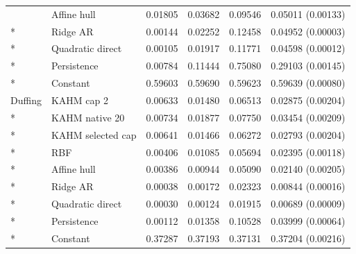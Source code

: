 \begin{longtable}{@{}llrrrr@{}}
 & Affine hull & 0.01805 & 0.03682 & 0.09546 & 0.05011 (0.00133) \\*
 & Ridge AR & 0.00144 & 0.02252 & 0.12458 & 0.04952 (0.00003) \\*
 & Quadratic direct & 0.00105 & 0.01917 & 0.11771 & 0.04598 (0.00012) \\*
 & Persistence & 0.00784 & 0.11444 & 0.75080 & 0.29103 (0.00145) \\*
 & Constant & 0.59603 & 0.59690 & 0.59623 & 0.59639 (0.00080) \\
\addlinespace
Duffing & KAHM cap 2 & 0.00633 & 0.01480 & 0.06513 & 0.02875 (0.00204) \\*
 & KAHM native 20 & 0.00734 & 0.01877 & 0.07750 & 0.03454 (0.00209) \\*
 & KAHM selected cap & 0.00641 & 0.01466 & 0.06272 & 0.02793 (0.00204) \\*
 & RBF & 0.00406 & 0.01085 & 0.05694 & 0.02395 (0.00118) \\*
 & Affine hull & 0.00386 & 0.00944 & 0.05090 & 0.02140 (0.00205) \\*
 & Ridge AR & 0.00038 & 0.00172 & 0.02323 & 0.00844 (0.00016) \\*
 & Quadratic direct & 0.00030 & 0.00124 & 0.01915 & 0.00689 (0.00009) \\*
 & Persistence & 0.00112 & 0.01358 & 0.10528 & 0.03999 (0.00064) \\*
 & Constant & 0.37287 & 0.37193 & 0.37131 & 0.37204 (0.00216) \\
\end{longtable}
\endgroup

